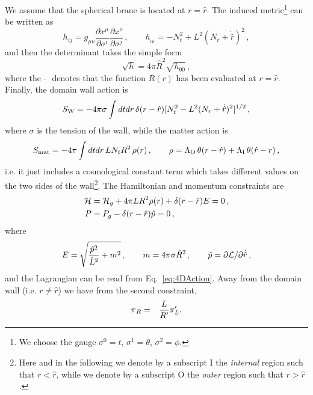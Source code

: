 \documentclass[11pt,a4paper]{article}
\begin{document}
We assume that the spherical brane is located at $r = \hat{r}$. The induced metric\footnote{We choose the gauge $\sigma^{0} = t$, $\sigma^{1} = \theta$, $\sigma^{2} = \phi$.} can be written as
\begin{equation}
h_{ij} = g_{\mu\nu}\frac{\partial x^{\mu}}{\partial\sigma^{i}}\frac{\partial x^{\nu}}{\partial\sigma^{j}}\,, \qquad h_{_{00}}=-N_{t}^{2}+L^{2}(N_{r}+\dot{\hat{r}})^{2} \,,
\end{equation}
and then the determinant takes the simple form
\begin{equation}
\sqrt{h} = 4\pi\hat{R}^{2}\sqrt{h_{00}} \,,
\end{equation}
where the $ \,\, \hat{} \,\,$ denotes that the function $R(r)$ has been evaluated at $r = \hat{r}$. Finally, the domain wall action is
\begin{equation}
\label{eq:SDW}
S_{{\rm W}}=-4\pi\sigma\int dtdr \, \delta(r-\hat{r})[N_{t}^{2}-L^{2}(N_{r}+\dot{\hat{r}})^{2}]^{1/2} \,,
\end{equation}
where $\sigma$ is the tension of the wall, while the matter action is
\begin{equation}
\label{eq:Sm}
S_{{\rm mat}} = - 4\pi\int dtdr \, L N_{t} R^{2} \, \rho(r)\,, \qquad \rho = \Lambda_{{\rm O}} \,\theta(r - \hat{r}) + \Lambda_{{\rm I}}\, \theta(\hat{r}-r) \,,
\end{equation}
i.e. it just includes a cosmological constant term which takes different values on the two sides of the wall\footnote{Here and in the following we denote by a subscript $\text{I}$ the \textit{internal} region such that $r < \hat{r}$, while we denote by a subscript $\text{O}$ the \textit{outer} region such that $r > \hat{r}$.}. The Hamiltonian and momentum constraints are 
\begin{align}
\label{eq:H}
{\cal H} & = {\cal H}_{g}+4\pi LR^{2}\rho(r)+\delta(r-\hat{r})E=0 \,,\\
\label{eq:P}
P & = P_{g}-\delta(r-\hat{r})\hat{p}=0 \,,
\end{align}
where 
\begin{equation}
\label{eq:E and m}
E = \sqrt{\frac{\hat{p}^{2}}{\hat{L}^{2}}+m^{2}}\,, \qquad m=4\pi\sigma\hat{R}^{2} \,, \qquad \hat{p}=\partial{\cal L}/\partial\dot{\hat{r}} \,,
\end{equation}
and the Lagrangian can be read from Eq.~\eqref{eq:4DAction}. Away from the domain wall (i.e. $r\ne\hat{r}$) we have from the second
constraint,
\begin{eqnarray}
\mbox{\ensuremath{\pi}}_{R} & = & \frac{L}{R'}\pi'_{L}.\label{eq:Pcons}
\end{eqnarray}
\end{document}
